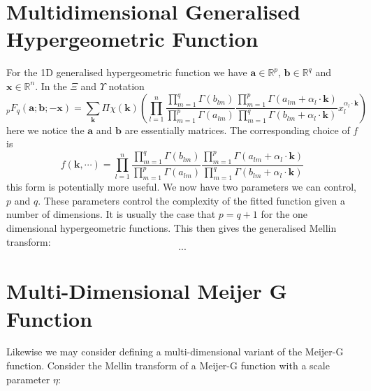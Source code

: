 \documentclass[journal=jcisd8,manuscript=article,layout=onecolumn,pdftex,floatfix,amsmath,amssymb,10pt]{achemso}
\begin{document}
\section{Multidimensional Generalised Hypergeometric Function}
For the 1D generalised hypergeometric function we have $\mathbf{a} \in \mathbb{R}^p$, $\mathbf{b} \in \mathbb{R}^q$ and $\mathbf{x} \in \mathbb{R}^n$. In the $\Xi$ and $\Upsilon$ notation
\begin{equation}
_pF_q(\mathbf{a};\mathbf{b};-\mathbf{x}) = \sum_{\mathbf{k}} \Pi\chi(\mathbf{k})     \left(\prod_{l=1}^n \frac{\prod_{m=1}^q \Gamma(b_{lm})}{\prod_{m=1}^p \Gamma(a_{lm})} \frac{\prod_{m=1}^p \Gamma(a_{lm} + \alpha_l \cdot \mathbf{k})}{\prod_{m=1}^q \Gamma(b_{lm} + \alpha_l \cdot \mathbf{k})} x_l^{\alpha_l \cdot \mathbf{k}}\right)
\end{equation}
here we notice the $\mathbf{a}$ and $\mathbf{b}$ are essentially matrices. The corresponding choice of $f$ is
\begin{equation}
f(\mathbf{k},\cdots) = \prod_{l=1}^n \frac{\prod_{m=1}^q \Gamma(b_{lm})}{\prod_{m=1}^p \Gamma(a_{lm})} \frac{\prod_{m=1}^p \Gamma(a_{lm} + \alpha_l \cdot \mathbf{k})}{\prod_{m=1}^q \Gamma(b_{lm} + \alpha_l \cdot \mathbf{k})}
\end{equation}
this form is potentially more useful. We now have two parameters we can control, $p$ and $q$. These parameters control the complexity of the fitted function given a number of dimensions. It is usually the case that $p=q+1$ for the one dimensional hypergeometric functions. This then gives the generalised Mellin transform:
$$
...
$$

\section{Multi-Dimensional Meijer G Function}
Likewise we may consider defining a multi-dimensional variant of the Meijer-G function. Consider the Mellin transform of a Meijer-G function with a scale parameter $\eta$:
\end{document}
